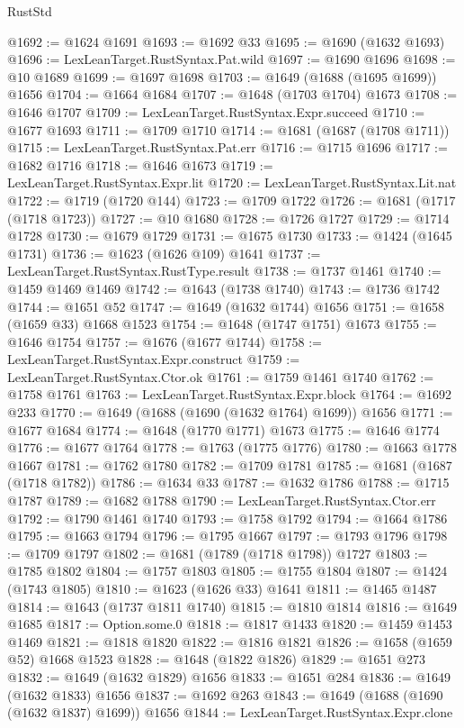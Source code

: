 \begin{lexlean}{RustStd}
\begin{coremodule}
@1692 := @1624 @1691
@1693 := @1692 @33
@1695 := @1690 (@1632 @1693)
@1696 := LexLeanTarget.RustSyntax.Pat.wild
@1697 := @1690 @1696
@1698 := @10 @1689
@1699 := @1697 @1698
@1703 := @1649 (@1688 (@1695 @1699)) @1656
@1704 := @1664 @1684
@1707 := @1648 (@1703 @1704) @1673
@1708 := @1646 @1707
@1709 := LexLeanTarget.RustSyntax.Expr.succeed
@1710 := @1677 @1693
@1711 := @1709 @1710
@1714 := @1681 (@1687 (@1708 @1711))
@1715 := LexLeanTarget.RustSyntax.Pat.err
@1716 := @1715 @1696
@1717 := @1682 @1716
@1718 := @1646 @1673
@1719 := LexLeanTarget.RustSyntax.Expr.lit
@1720 := LexLeanTarget.RustSyntax.Lit.nat
@1722 := @1719 (@1720 @144)
@1723 := @1709 @1722
@1726 := @1681 (@1717 (@1718 @1723))
@1727 := @10 @1680
@1728 := @1726 @1727
@1729 := @1714 @1728
@1730 := @1679 @1729
@1731 := @1675 @1730
@1733 := @1424 (@1645 @1731)
@1736 := @1623 (@1626 @109) @1641
@1737 := LexLeanTarget.RustSyntax.RustType.result
@1738 := @1737 @1461
@1740 := @1459 @1469 @1469
@1742 := @1643 (@1738 @1740)
@1743 := @1736 @1742
@1744 := @1651 @52
@1747 := @1649 (@1632 @1744) @1656
@1751 := @1658 (@1659 @33) @1668 @1523
@1754 := @1648 (@1747 @1751) @1673
@1755 := @1646 @1754
@1757 := @1676 (@1677 @1744)
@1758 := LexLeanTarget.RustSyntax.Expr.construct
@1759 := LexLeanTarget.RustSyntax.Ctor.ok
@1761 := @1759 @1461 @1740
@1762 := @1758 @1761
@1763 := LexLeanTarget.RustSyntax.Expr.block
@1764 := @1692 @233
@1770 := @1649 (@1688 (@1690 (@1632 @1764) @1699)) @1656
@1771 := @1677 @1684
@1774 := @1648 (@1770 @1771) @1673
@1775 := @1646 @1774
@1776 := @1677 @1764
@1778 := @1763 (@1775 @1776)
@1780 := @1663 @1778 @1667
@1781 := @1762 @1780
@1782 := @1709 @1781
@1785 := @1681 (@1687 (@1718 @1782))
@1786 := @1634 @33
@1787 := @1632 @1786
@1788 := @1715 @1787
@1789 := @1682 @1788
@1790 := LexLeanTarget.RustSyntax.Ctor.err
@1792 := @1790 @1461 @1740
@1793 := @1758 @1792
@1794 := @1664 @1786
@1795 := @1663 @1794
@1796 := @1795 @1667
@1797 := @1793 @1796
@1798 := @1709 @1797
@1802 := @1681 (@1789 (@1718 @1798)) @1727
@1803 := @1785 @1802
@1804 := @1757 @1803
@1805 := @1755 @1804
@1807 := @1424 (@1743 @1805)
@1810 := @1623 (@1626 @33) @1641
@1811 := @1465 @1487
@1814 := @1643 (@1737 @1811 @1740)
@1815 := @1810 @1814
@1816 := @1649 @1685
@1817 := Option.some.{0}
@1818 := @1817 @1433
@1820 := @1459 @1453 @1469
@1821 := @1818 @1820
@1822 := @1816 @1821
@1826 := @1658 (@1659 @52) @1668 @1523
@1828 := @1648 (@1822 @1826)
@1829 := @1651 @273
@1832 := @1649 (@1632 @1829) @1656
@1833 := @1651 @284
@1836 := @1649 (@1632 @1833) @1656
@1837 := @1692 @263
@1843 := @1649 (@1688 (@1690 (@1632 @1837) @1699)) @1656
@1844 := LexLeanTarget.RustSyntax.Expr.clone

\end{coremodule}
\end{lexlean}
